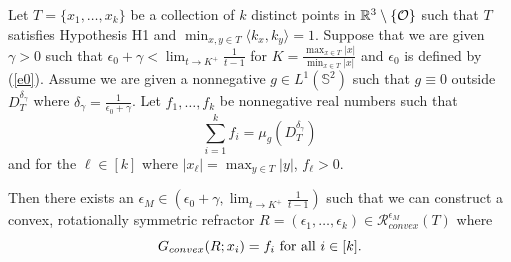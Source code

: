 \documentclass[review]{elsarticle}
\begin{document}
\begin{prop}\label{line-conv}
Let $T = \{x_1,\dots, x_k\}$ be a collection of $k$ distinct points in $\mathbb{R}^3\setminus \{\mathcal{O}\}$ such that $T$ satisfies Hypothesis H1 and $\min_{x,y\in T}\langle k_x,k_y\rangle=1.$ Suppose that we are given $\gamma>0$ such that $\epsilon_0+\gamma<\lim_{t\to K^+}\frac{1}{t-1}$ for $K=\frac{\max_{x\in T} |x|}{\min_{x\in T} |x|}$ and $\epsilon_0$ is defined by (\ref{e0}). Assume we are given a nonnegative $g\in L^1(\mathbb{S}^2)$ such that $g\equiv 0$ outside $D_T^{\delta_\gamma}$ where $\delta_\gamma=\frac1{\epsilon_0+\gamma}$. Let $f_1,\dots,f_k$ be nonnegative
real numbers such that
\begin{equation}
    \sum_{i=1}^k f_i = \mu_{g}(D_T^{\delta_\gamma})
\end{equation}
and for the $\ell\in[k]$ where $|x_\ell|=\max_{y\in T}|y|$, $f_\ell>0.$ 

Then there exists an $\epsilon_M\in(\epsilon_0+\gamma,\lim_{t\to K^+}\frac{1}{t-1})$ such that we can construct a convex, rotationally symmetric refractor $R = (\epsilon_1,\dots,\epsilon_k) \in \mathcal{R}_{convex}^{\epsilon_M} (T)$ where
\begin{equation}
G_{convex}( R;x_i) = f_i \textnormal{ for all } i \in[k].
\end{equation}
\end{prop}
\end{document}
